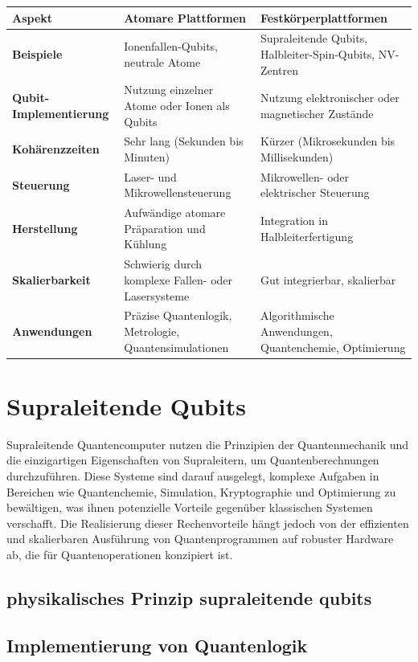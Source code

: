 \begin{tabular}{ |p{4cm}|p{5cm}|p{5cm}|  }
 \hline
 \textbf{Aspekt}& \textbf{Atomare Plattformen} & \textbf{Festkörperplattformen}\\
 \hline
 \textbf{Beispiele}   & Ionenfallen-Qubits, neutrale Atome    &Supraleitende Qubits, Halbleiter-Spin-Qubits, NV-Zentren\\
 \textbf{Qubit-Implementierung}&   Nutzung einzelner Atome oder Ionen als Qubits	  & Nutzung elektronischer oder magnetischer Zustände
\\
 \textbf{Kohärenzzeiten} &Sehr lang (Sekunden bis Minuten)	 & Kürzer (Mikrosekunden bis Millisekunden)
\\
 \textbf{Steuerung}    &Laser- und Mikrowellensteuerung	 & Mikrowellen- oder elektrischer Steuerung
\\
 \textbf{Herstellung}&   Aufwändige atomare Präparation und Kühlung	  & Integration in Halbleiterfertigung
\\
 \textbf{Skalierbarkeit}& Schwierig durch komplexe Fallen- oder Lasersysteme	  & Gut integrierbar, skalierbar
   \\
 \textbf{Anwendungen}& Präzise Quantenlogik, Metrologie, Quantensimulationen	  & Algorithmische Anwendungen, Quantenchemie, Optimierung
\\
 \hline
\end{tabular}

\section{Supraleitende Qubits}
Supraleitende Quantencomputer nutzen die Prinzipien der Quantenmechanik und die einzigartigen Eigenschaften von Supraleitern, um Quantenberechnungen durchzuführen. Diese Systeme sind darauf ausgelegt, komplexe Aufgaben in Bereichen wie Quantenchemie, Simulation, Kryptographie und Optimierung zu bewältigen, was ihnen potenzielle Vorteile gegenüber klassischen Systemen verschafft. Die Realisierung dieser Rechenvorteile hängt jedoch von der effizienten und skalierbaren Ausführung von Quantenprogrammen auf robuster Hardware ab, die für Quantenoperationen konzipiert ist.
\subsection{physikalisches Prinzip supraleitende qubits}
\subsection{Implementierung von Quantenlogik}
